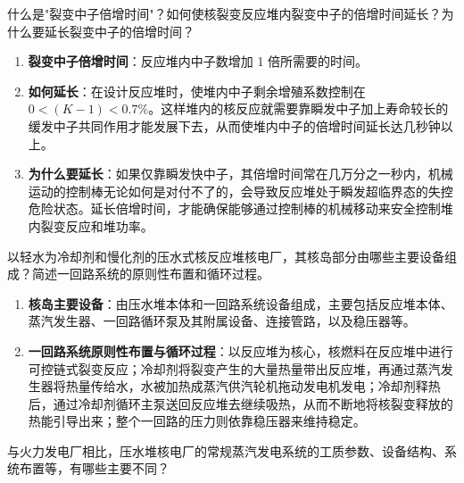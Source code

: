 \begin{problem}
什么是"裂变中子倍增时间"？如何使核裂变反应堆内裂变中子的倍增时间延长？为什么要延长裂变中子的倍增时间？
\end{problem}

\begin{solution}
\begin{enumerate}
  \item \textbf{裂变中子倍增时间}：反应堆内中子数增加 1 倍所需要的时间。
  \item \textbf{如何延长}：在设计反应堆时，使堆内中子剩余增殖系数控制在 \(0<(K-1)<0.7\%\)。这样堆内的核反应就需要靠瞬发中子加上寿命较长的缓发中子共同作用才能发展下去，从而使堆内中子的倍增时间延长达几秒钟以上。
  \item \textbf{为什么要延长}：如果仅靠瞬发快中子，其倍增时间常在几万分之一秒内，机械运动的控制棒无论如何是对付不了的，会导致反应堆处于瞬发超临界态的失控危险状态。延长倍增时间，才能确保能够通过控制棒的机械移动来安全控制堆内裂变反应和堆功率。
\end{enumerate}
\end{solution}

\begin{problem}
以轻水为冷却剂和慢化剂的压水式核反应堆核电厂，其核岛部分由哪些主要设备组成？简述一回路系统的原则性布置和循环过程。
\end{problem}

\begin{solution}
\begin{enumerate}
  \item \textbf{核岛主要设备}：由压水堆本体和一回路系统设备组成，主要包括反应堆本体、蒸汽发生器、一回路循环泵及其附属设备、连接管路，以及稳压器等。
  \item \textbf{一回路系统原则性布置与循环过程}：以反应堆为核心，核燃料在反应堆中进行可控链式裂变反应；冷却剂将裂变产生的大量热量带出反应堆，再通过蒸汽发生器将热量传给水，水被加热成蒸汽供汽轮机拖动发电机发电；冷却剂释热后，通过冷却剂循环主泵送回反应堆去继续吸热，从而不断地将核裂变释放的热能引导出来；整个一回路的压力则依靠稳压器来维持稳定。
\end{enumerate}
\end{solution}

\begin{problem}
与火力发电厂相比，压水堆核电厂的常规蒸汽发电系统的工质参数、设备结构、系统布置等，有哪些主要不同？
\end{problem}

